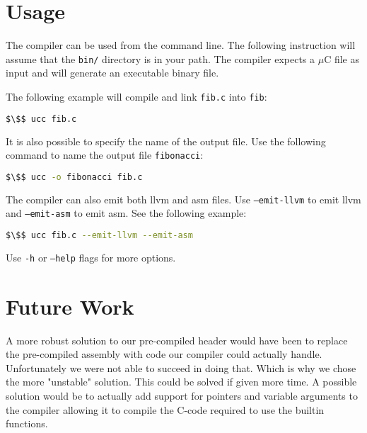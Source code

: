 
\section{Usage}

The compiler can be used from the command line. The following instruction will assume that the \texttt{bin/} directory is in your path. The compiler expects a $\mu$C file as input and will generate an executable binary file.

The following example will compile and link \texttt{fib.c} into \texttt{fib}:
\begin{lstlisting}[language=bash,numbers=none]
    $\$$ ucc fib.c
\end{lstlisting}

It is also possible to specify the name of the output file. Use the following command to name the output file \texttt{fibonacci}:
\begin{lstlisting}[language=bash,numbers=none]
    $\$$ ucc -o fibonacci fib.c
\end{lstlisting}

The compiler can also emit both llvm and asm files. Use \texttt{--emit-llvm} to emit llvm and \texttt{--emit-asm} to emit asm. See the following example:
\begin{lstlisting}[language=bash,numbers=none]
    $\$$ ucc fib.c --emit-llvm --emit-asm
\end{lstlisting}

Use \texttt{-h} or \texttt{--help} flags for more options.


\section{Future Work}

A more robust solution to our pre-compiled header would have been to replace the pre-compiled assembly with code our compiler could actually handle. Unfortunately we were not able to succeed in doing that. Which is why we chose the more "unstable" solution. This could be solved if given more time. A possible solution would be to actually add support for pointers and variable arguments to the compiler allowing it to compile the C-code required to use the builtin functions.

